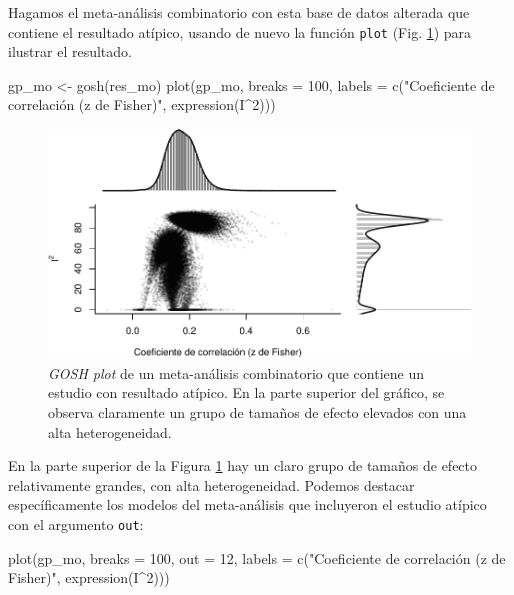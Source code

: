 \documentclass[
  bookmarksnumbered]{article}
\newenvironment{Shaded}{\begin{snugshade}}{\end{snugshade}}
\newcommand{\AttributeTok}[1]{\textcolor[rgb]{0.00,0.34,0.68}{#1}}
\newcommand{\DecValTok}[1]{\textcolor[rgb]{0.69,0.50,0.00}{#1}}
\newcommand{\FunctionTok}[1]{\textcolor[rgb]{0.39,0.29,0.61}{#1}}
\newcommand{\NormalTok}[1]{\textcolor[rgb]{0.12,0.11,0.11}{#1}}
\newcommand{\OtherTok}[1]{\textcolor[rgb]{0.00,0.43,0.16}{#1}}
\newcommand{\SpecialCharTok}[1]{\textcolor[rgb]{0.24,0.68,0.91}{#1}}
\newcommand{\StringTok}[1]{\textcolor[rgb]{0.75,0.01,0.01}{#1}}
\begin{document}
Hagamos el meta-análisis combinatorio con esta base de datos alterada que contiene el resultado atípico, usando de nuevo la función \texttt{plot} (Fig. \ref{fig:gosh2}) para ilustrar el resultado.

\begin{Shaded}
\begin{Highlighting}[]
\NormalTok{gp\_mo }\OtherTok{\textless{}{-}} \FunctionTok{gosh}\NormalTok{(res\_mo)}
\FunctionTok{plot}\NormalTok{(gp\_mo, }\AttributeTok{breaks =} \DecValTok{100}\NormalTok{,}
     \AttributeTok{labels =} \FunctionTok{c}\NormalTok{(}\StringTok{"Coeficiente de correlación (z de Fisher)"}\NormalTok{, }
                \FunctionTok{expression}\NormalTok{(I}\SpecialCharTok{\^{}}\DecValTok{2}\NormalTok{)))}
\end{Highlighting}
\end{Shaded}

\begin{figure}
\centering
\includegraphics{Meta-analysis_files/figure-latex/gosh2-1.pdf}
\caption{\label{fig:gosh2}\emph{GOSH plot} de un meta-análisis combinatorio que contiene un estudio con resultado atípico. En la parte superior del gráfico, se observa claramente un grupo de tamaños de efecto elevados con una alta heterogeneidad.}
\end{figure}

En la parte superior de la Figura \ref{fig:gosh2} hay un claro grupo de tamaños de efecto relativamente grandes, con alta heterogeneidad. Podemos destacar específicamente los modelos del meta-análisis que incluyeron el estudio atípico con el argumento \texttt{out}:

\begin{Shaded}
\begin{Highlighting}[]
\FunctionTok{plot}\NormalTok{(gp\_mo, }\AttributeTok{breaks =} \DecValTok{100}\NormalTok{, }\AttributeTok{out =} \DecValTok{12}\NormalTok{,}
     \AttributeTok{labels =} \FunctionTok{c}\NormalTok{(}\StringTok{"Coeficiente de correlación (z de Fisher)"}\NormalTok{, }
                \FunctionTok{expression}\NormalTok{(I}\SpecialCharTok{\^{}}\DecValTok{2}\NormalTok{)))}
\end{Highlighting}
\end{Shaded}
\end{document}
